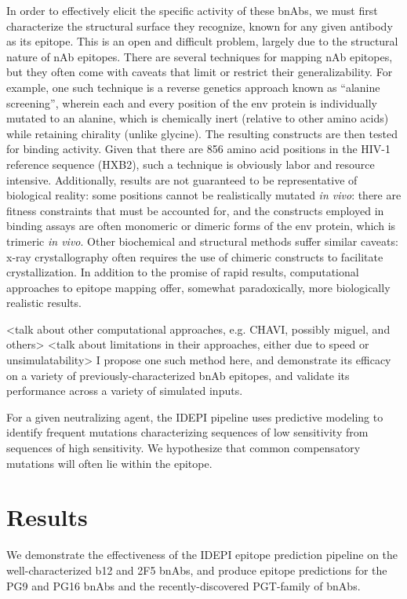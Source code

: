 \documentclass[10pt]{article}
\newcommand{\idepi}{{IDEPI}}
\newcommand{\hiv}{{HIV}-1}
\begin{document}
In order to effectively elicit the specific activity of these bnAbs,
we must first characterize the structural surface they recognize,
known for any given antibody as its epitope.
This is an open and difficult problem, largely due to the structural nature of nAb epitopes.
There are several techniques for mapping nAb epitopes, but they often come with caveats that limit or restrict their generalizability.
For example, one such technique is a reverse genetics approach known as “alanine screening”,
wherein each and every position of the env protein is individually mutated to an alanine,
which is chemically inert (relative to other amino acids) while retaining chirality (unlike glycine).
The resulting constructs are then tested for binding activity.
Given that there are 856 amino acid positions in the \hiv{} reference sequence ({HXB2}),
such a technique is obviously labor and resource intensive.
Additionally, results are not guaranteed to be representative of biological reality:
some positions cannot be realistically mutated \emph{in vivo}:
there are fitness constraints that must be accounted for,
and the constructs employed in binding assays are often monomeric or dimeric forms of the env protein, which is trimeric \emph{in vivo}.
Other biochemical and structural methods suffer similar caveats:
x-ray crystallography often requires the use of chimeric constructs to facilitate crystallization.
In addition to the promise of rapid results, computational approaches to epitope mapping offer, somewhat paradoxically, more biologically realistic results.

<talk about other computational approaches, e.g. CHAVI, possibly miguel, and others>
<talk about limitations in their approaches, either due to speed or unsimulatability> I propose one such method here, and demonstrate its efficacy on a variety of previously-characterized bnAb epitopes, and validate its performance across a variety of simulated inputs.

For a given neutralizing agent,
the \idepi{} pipeline uses predictive modeling to identify frequent mutations characterizing sequences of low sensitivity from sequences of high sensitivity.
We hypothesize that common compensatory mutations will often lie within the epitope.

\section*{Results}

We demonstrate the effectiveness of the \idepi{} epitope prediction pipeline on the well-characterized b12 and 2F5 bnAbs,
and produce epitope predictions for the PG9 and PG16 bnAbs and the recently-discovered PGT-family of bnAbs.
\end{document}

